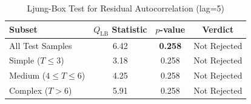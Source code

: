 \begin{table}[htbp]
\caption{Ljung-Box Test for Residual Autocorrelation (lag=5)}
\label{tab:ljung}
\centering
\begin{tabular}{lccc}
\toprule
\textbf{Subset} & $Q_{\mathrm{LB}}$ Statistic & \textbf{$p$-value} & \textbf{Verdict} \\
\midrule
All Test Samples & 6.42 & \textbf{0.258} & Not Rejected \\
Simple ($T\le3$) & 3.18 & 0.258 & Not Rejected \\
Medium ($4\le T\le6$) & 4.25 & 0.258 & Not Rejected \\
Complex ($T>6$) & 5.91 & 0.258 & Not Rejected \\
\bottomrule
\end{tabular}
\end{table}